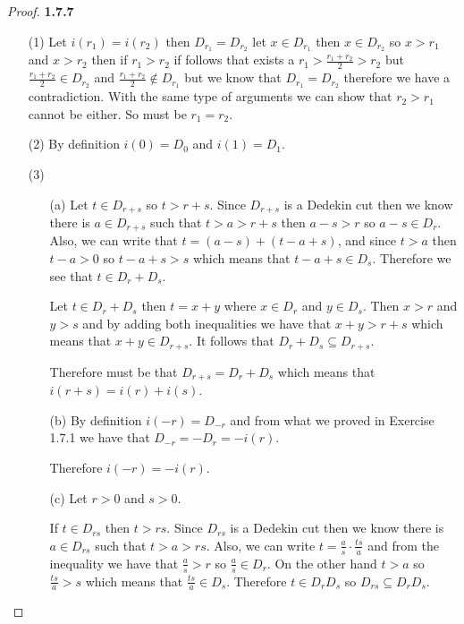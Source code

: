 \documentclass[11pt]{article}
\theoremstyle{definition}
\begin{document}
    \begin{proof}{\textbf{1.7.7}}
        \begin{itemize}
            \item [(1)] Let $i(r_1) = i(r_2)$ then $D_{r_1} = D_{r_2}$ let
            $x \in D_{r_1}$ then $x \in D_{r_2}$ so $x>r_1$ and $x>r_2$ then if
            $r_1>r_2$ if follows that exists a $r_1>\frac{r_1+r_2}{2}>r_2$ but
            $\frac{r_1+r_2}{2} \in D_{r_2}$ and $\frac{r_1+r_2}{2} \notin D_{r_1}$ but
            we know that $D_{r_1} = D_{r_2}$ therefore we have a contradiction.
            With the same type of arguments we can show that $r_2>r_1$ cannot be either.
            So must be $r_1 = r_2$.
            \item [(2)] By definition $i(0) = D_0$ and $i(1) = D_1$.
            \item [(3)]
            \begin{itemize}
                \item [(a)] Let $t \in D_{r+s}$ so $t > r+s$. Since $D_{r+s}$ is a
                Dedekin cut then we know there is $a \in D_{r+s}$ such that $t>a>r+s$
                then $a-s>r$ so $a-s \in D_{r}$. Also, we can write that
                $t = (a-s) + (t -a + s)$, and since $t>a$ then $t-a>0$ so $t-a+s>s$
                which means that $t-a+s \in D_s$. Therefore we see that $t \in D_r + D_s$.  

                Let $t \in D_r + D_s$ then $t = x + y$ where $x \in D_r$ and $y \in D_s$.
                Then $x>r$ and $y>s$ and by adding both inequalities we have that
                $x+y>r+s$ which means that $x+y \in D_{r+s}$. It follows that
                $D_r + D_s \subseteq D_{r+s}$.
                
                Therefore must be that  $D_{r+s} = D_r + D_s$ which means that\\
                $i(r+s) = i(r)+i(s)$.
                \item [(b)] By definition $i(-r) = D_{-r}$ and from what we proved in
                Exercise 1.7.1 we have that $D_{-r} = -D_{r} = -i(r)$.
                
                Therefore $i(-r) = -i(r)$.
\cleardoublepage
                \item [(c)]Let $r>0$ and $s>0$.
                
                If $t \in D_{rs}$ then $t > rs$. Since $D_{rs}$ is a Dedekin cut then we
                know there is $a \in D_{rs}$ such that $t>a>rs$. Also, we can write
                $t = \frac{a}{s}\cdot\frac{ts}{a}$ and from the inequality we have that 
                $\frac{a}{s}>r$ so $\frac{a}{s} \in D_{r}$.
                On the other hand $t>a$ so $\frac{ts}{a}>s$ which means that
                $\frac{ts}{a} \in D_s$. Therefore $t \in D_rD_s$ so
                $D_{rs} \subseteq D_rD_s$.


\end{itemize}
\end{itemize}
\end{proof}
\end{document}
